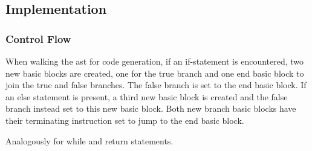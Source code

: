 
\subsection{Implementation}

\subsubsection{Control Flow}

When walking the ast for code generation, if an if-statement is encountered, two new basic blocks are created, one for the true branch and one end basic block to join the true and false branches. The false branch is set to the end basic block. If an else statement is present, a third new basic block is created and the false branch instead set to this new basic block. Both new branch basic blocks have their terminating instruction set to jump to the end basic block.

Analogously for while and return statements.

